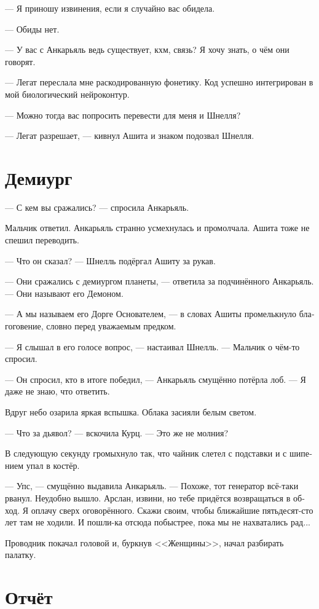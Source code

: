 \documentclass[a4paper,10pt,fleqn]{book}\usepackage{polyglossia}\setdefaultlanguage[babelshorthands=true]{russian}\setotherlanguage{english}\defaultfontfeatures{Ligatures=TeX,Mapping=tex-text}\usepackage{xcolor}\newcommand{\ml}[3]{#2}
\begin{document}
--- Я приношу извинения, если я случайно вас обидела.

--- Обиды нет.

--- У вас с Анкарьяль ведь существует, кхм, связь?
Я хочу знать, о чём они говорят.

--- Легат переслала мне раскодированную фонетику.
Код успешно интегрирован в мой биологический нейроконтур.

--- Можно тогда вас попросить перевести для меня и Шнелля?

--- Легат разрешает, --- кивнул Ашита и знаком подозвал Шнелля.

\section{Демиург}

--- С кем вы сражались? --- спросила Анкарьяль.

Мальчик ответил.
Анкарьяль странно усмехнулась и промолчала.
Ашита тоже не спешил переводить.

--- Что он сказал? --- Шнелль подёргал Ашиту за рукав.

--- Они сражались с демиургом планеты, --- ответила за подчинённого Анкарьяль.
--- Они называют его Демоном.

--- А мы называем его Дорге Основателем, --- в словах Ашиты промелькнуло благоговение, словно перед уважаемым предком.

--- Я слышал в его голосе вопрос, --- настаивал Шнелль.
--- Мальчик о чём-то спросил.

--- Он спросил, кто в итоге победил, --- Анкарьяль смущённо потёрла лоб.
--- Я даже не знаю, что ответить.

Вдруг небо озарила яркая вспышка.
Облака засияли белым светом.

--- Что за дьявол? --- вскочила Курц.
--- Это же не молния?

В следующую секунду громыхнуло так, что чайник слетел с подставки и с шипением упал в костёр.

--- Упс, --- смущённо выдавила Анкарьяль.
--- Похоже, тот генератор всё-таки рванул.
Неудобно вышло.
Арслан, извини, но тебе придётся возвращаться в обход.
Я оплачу сверх оговорённого.
Скажи своим, чтобы ближайшие пятьдесят-сто лет там не ходили.
И пошли-ка отсюда побыстрее, пока мы не нахватались рад...

Проводник покачал головой и, буркнув <<Женщины>>, начал разбирать палатку.

\section{Отчёт}
\end{document}

